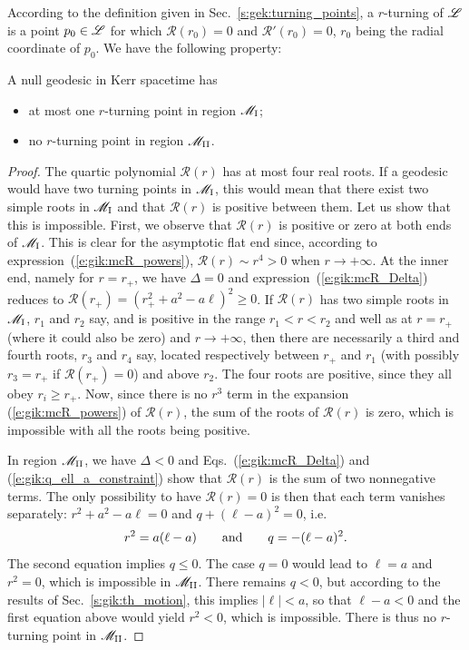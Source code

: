 According to the definition given in Sec.~\ref{s:gek:turning_points},
a $r$-turning of $\mathscr{L}$ is a point $p_0\in \mathscr{L}$ for which $\mathcal{R}(r_0) = 0$
and $\mathcal{R}'(r_0) = 0$, $r_0$ being the radial coordinate of $p_0$.
We have the following property:
\begin{greybox}
A null geodesic in Kerr spacetime has
\begin{itemize}
\item at most one $r$-turning point in region $\mathscr{M}_{\rm I}$;
\item no $r$-turning point in region $\mathscr{M}_{\rm II}$.
\end{itemize}
\end{greybox}
\begin{proof}
The quartic polynomial $\mathcal{R}(r)$ has at most four real roots. If
a geodesic would have two turning points in $\mathscr{M}_{\rm I}$, this would mean
that there exist two simple roots in $\mathscr{M}_{\rm I}$ and that
$\mathcal{R}(r)$ is positive between them. Let us show that this is impossible.
First, we observe that $\mathcal{R}(r)$ is positive or zero at both
ends of $\mathscr{M}_{\rm I}$. This is clear
for the asymptotic flat end since, according to expression~(\ref{e:gik:mcR_powers}),
$\mathcal{R}(r) \sim r^4 > 0$ when $r\to +\infty$. At the inner end,
namely for $r = r_+$,
we have $\Delta = 0$ and expression~(\ref{e:gik:mcR_Delta}) reduces to
$\mathcal{R}(r_+) = (r_+^2 + a^2 - a \ell)^2 \geq 0$.
If $\mathcal{R}(r)$ has two simple roots in $\mathscr{M}_{\rm I}$, $r_1$ and $r_2$ say, and is
positive in the range $r_1< r < r_2$ and well as at $r=r_+$ (where it could also be zero)
and $r\to+\infty$, then there
are necessarily a third and fourth roots, $r_3$ and $r_4$ say,
located respectively between $r_+$ and $r_1$ (with possibly $r_3 = r_+$ if $\mathcal{R}(r_+)= 0$)
and above $r_2$.
The four roots are positive, since they all obey $r_i \geq r_+$. Now,
since there is no $r^3$ term in the expansion (\ref{e:gik:mcR_powers}) of $\mathcal{R}(r)$,
the sum of the roots of $\mathcal{R}(r)$ is zero, which is impossible with all
the roots being positive.

In region $\mathscr{M}_{\rm II}$, we have $\Delta < 0$ and
Eqs.~(\ref{e:gik:mcR_Delta}) and (\ref{e:gik:q_ell_a_constraint}) show that
$\mathcal{R}(r)$ is the sum of two nonnegative terms. The only possibility
to have $\mathcal{R}(r)=0$ is then that each term vanishes separately:
$r^2 + a^2 - a\ell = 0$ and $q + (\ell -a)^2 = 0$, i.e.
\[
  r^2 = a (\ell - a) \qquad\mbox{and}\qquad q = - (\ell - a)^2 .
\]
The second equation implies $q\leq 0$. The case $q=0$ would lead to $\ell = a$ and $r^2 = 0$,
which is impossible in $\mathscr{M}_{\rm II}$. There remains $q < 0$, but
according to the results of Sec.~\ref{s:gik:th_motion}, this implies $|\ell| < a$, so
that $\ell - a < 0$ and the first equation above would yield $r^2 < 0$, which is impossible.
There is thus no $r$-turning point in $\mathscr{M}_{\rm II}$.
\end{proof}


